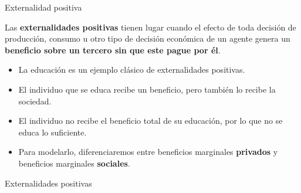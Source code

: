 \documentclass{beamer}
\begin{document}
\begin{frame}{Externalidad positiva}
    \begin{boxB}
        Las \textbf{externalidades positivas} tienen lugar cuando el efecto de toda decisión de producción, consumo u otro tipo de decisión económica de un agente genera un \textbf{beneficio sobre un tercero sin que este pague por él}.
    \end{boxB}
    \begin{itemize}
        \item La educación es un ejemplo clásico de externalidades positivas.
        \item El individuo que se educa recibe un beneficio, pero también lo recibe la sociedad.
        \item El individuo no recibe el beneficio total de su educación, por lo que no se educa lo suficiente.
        \item Para modelarlo, diferenciaremos entre beneficios marginales \textbf{privados} y beneficios marginales \textbf{sociales}.
    \end{itemize}
\end{frame}

\begin{frame}{Externalidades positivas}
\begin{figure} [H]
\centering
{}
\end{figure} 
\end{frame}
\end{document}
